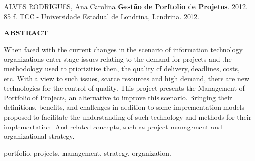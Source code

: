 \singlespacing
\noindent ALVES RODRIGUES,  Ana Carolina  {\bf Gest\~ao de Porftolio de Projetos}. 2012. 85 f. TCC - Universidade Estadual de Londrina, Londrina. 2012. \\
\begin{center}
{\bf {\Large ABSTRACT}}
\end{center}
When faced with the current changes in the scenario of information technology organizations enter stage issues relating to the demand for projects and the 
methodology used to priorizitize then, the quality of delivery, deadlines, costs, etc. With a view to such issues, scarce resources and high demand, there 
are new technologies for the control of quality. This project presents the Management of Portfolio of Projects, an alternative to improve this scenario. 
Bringing their definitions, benefits, and challenges in addition to some imprementation models proposed to facilitate the understanding of such technology 
and methods for their implementation. And related concepts, such as project management and organizational strategy.
\newline

  portfolio, projects, management, strategy, organization.
 
